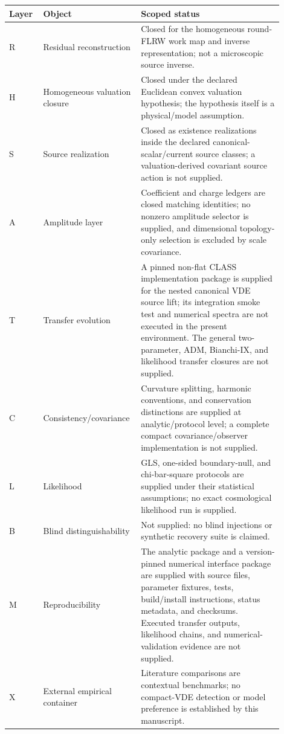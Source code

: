 \documentclass[11pt,a4paper]{article}
\numberwithin{equation}{section}
\theoremstyle{definition}
\theoremstyle{plain}
\theoremstyle{remark}
\begin{document}
\begin{center}
\small
\begin{tabular}{@{}p{0.12\linewidth}p{0.28\linewidth}p{0.50\linewidth}@{}}
\toprule
Layer & Object & Scoped status \\
\midrule
R & Residual reconstruction & Closed for the homogeneous round-FLRW work map and inverse representation; not a microscopic source inverse. \\
H & Homogeneous valuation closure & Closed under the declared Euclidean convex valuation hypothesis; the hypothesis itself is a physical/model assumption. \\
S & Source realization & Closed as existence realizations inside the declared canonical-scalar/current source classes; a valuation-derived covariant source action is not supplied. \\
A & Amplitude layer & Coefficient and charge ledgers are closed matching identities; no nonzero amplitude selector is supplied, and dimensional topology-only selection is excluded by scale covariance. \\
T & Transfer evolution & A pinned non-flat CLASS implementation package is supplied for the nested canonical VDE source lift; its integration smoke test and numerical spectra are not executed in the present environment. The general two-parameter, ADM, Bianchi-IX, and likelihood transfer closures are not supplied. \\
C & Consistency/covariance & Curvature splitting, harmonic conventions, and conservation distinctions are supplied at analytic/protocol level; a complete compact covariance/observer implementation is not supplied. \\
L & Likelihood & GLS, one-sided boundary-null, and chi-bar-square protocols are supplied under their statistical assumptions; no exact cosmological likelihood run is supplied. \\
B & Blind distinguishability & Not supplied: no blind injections or synthetic recovery suite is claimed. \\
M & Reproducibility & The analytic package and a version-pinned numerical interface package are supplied with source files, parameter fixtures, tests, build/install instructions, status metadata, and checksums. Executed transfer outputs, likelihood chains, and numerical-validation evidence are not supplied. \\
X & External empirical container & Literature comparisons are contextual benchmarks; no compact-VDE detection or model preference is established by this manuscript. \\
\bottomrule
\end{tabular}
\end{center}
\end{document}
